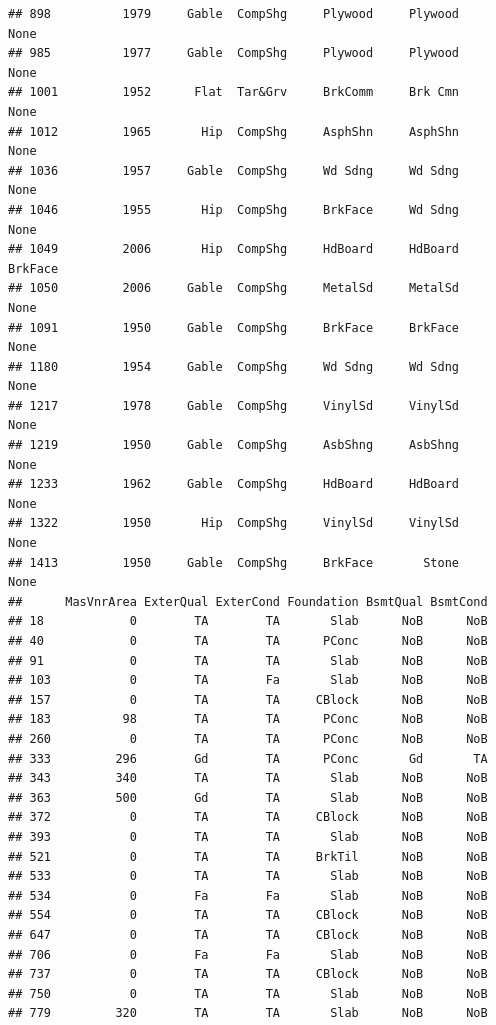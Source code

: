 \documentclass[]{article}
\begin{document}
\begin{verbatim}
## 898          1979     Gable  CompShg     Plywood     Plywood       None
## 985          1977     Gable  CompShg     Plywood     Plywood       None
## 1001         1952      Flat  Tar&Grv     BrkComm     Brk Cmn       None
## 1012         1965       Hip  CompShg     AsphShn     AsphShn       None
## 1036         1957     Gable  CompShg     Wd Sdng     Wd Sdng       None
## 1046         1955       Hip  CompShg     BrkFace     Wd Sdng       None
## 1049         2006       Hip  CompShg     HdBoard     HdBoard    BrkFace
## 1050         2006     Gable  CompShg     MetalSd     MetalSd       None
## 1091         1950     Gable  CompShg     BrkFace     BrkFace       None
## 1180         1954     Gable  CompShg     Wd Sdng     Wd Sdng       None
## 1217         1978     Gable  CompShg     VinylSd     VinylSd       None
## 1219         1950     Gable  CompShg     AsbShng     AsbShng       None
## 1233         1962     Gable  CompShg     HdBoard     HdBoard       None
## 1322         1950       Hip  CompShg     VinylSd     VinylSd       None
## 1413         1950     Gable  CompShg     BrkFace       Stone       None
##      MasVnrArea ExterQual ExterCond Foundation BsmtQual BsmtCond
## 18            0        TA        TA       Slab      NoB      NoB
## 40            0        TA        TA      PConc      NoB      NoB
## 91            0        TA        TA       Slab      NoB      NoB
## 103           0        TA        Fa       Slab      NoB      NoB
## 157           0        TA        TA     CBlock      NoB      NoB
## 183          98        TA        TA      PConc      NoB      NoB
## 260           0        TA        TA      PConc      NoB      NoB
## 333         296        Gd        TA      PConc       Gd       TA
## 343         340        TA        TA       Slab      NoB      NoB
## 363         500        Gd        TA       Slab      NoB      NoB
## 372           0        TA        TA     CBlock      NoB      NoB
## 393           0        TA        TA       Slab      NoB      NoB
## 521           0        TA        TA     BrkTil      NoB      NoB
## 533           0        TA        TA       Slab      NoB      NoB
## 534           0        Fa        Fa       Slab      NoB      NoB
## 554           0        TA        TA     CBlock      NoB      NoB
## 647           0        TA        TA     CBlock      NoB      NoB
## 706           0        Fa        Fa       Slab      NoB      NoB
## 737           0        TA        TA     CBlock      NoB      NoB
## 750           0        TA        TA       Slab      NoB      NoB
## 779         320        TA        TA       Slab      NoB      NoB

\end{verbatim}
\end{document}
